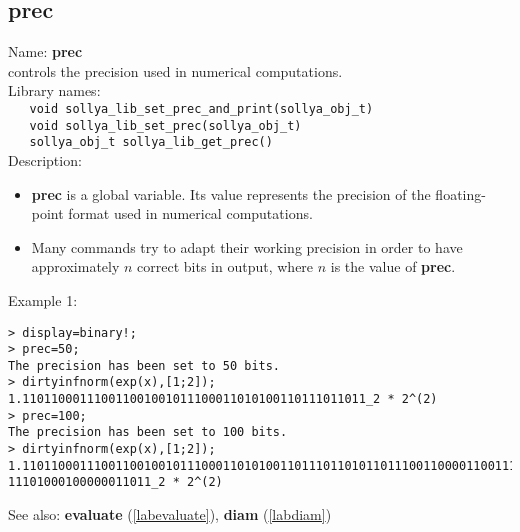 \subsection{prec}
\label{labprec}
\noindent Name: \textbf{prec}\\
\phantom{aaa}controls the precision used in numerical computations.\\[0.2cm]
\noindent Library names:\\
\verb|   void sollya_lib_set_prec_and_print(sollya_obj_t)|\\
\verb|   void sollya_lib_set_prec(sollya_obj_t)|\\
\verb|   sollya_obj_t sollya_lib_get_prec()|\\[0.2cm]
\noindent Description: \begin{itemize}

\item \textbf{prec} is a global variable. Its value represents the precision of the 
   floating-point format used in numerical computations.

\item Many commands try to adapt their working precision in order to have 
   approximately $n$ correct bits in output, where $n$ is the value of \textbf{prec}.
\end{itemize}
\noindent Example 1: 
\begin{center}\begin{minipage}{15cm}\begin{Verbatim}[frame=single]
> display=binary!;
> prec=50;
The precision has been set to 50 bits.
> dirtyinfnorm(exp(x),[1;2]);
1.110110001110011001001011100011010100110111011011_2 * 2^(2)
> prec=100;
The precision has been set to 100 bits.
> dirtyinfnorm(exp(x),[1;2]);
1.110110001110011001001011100011010100110111011010110111001100001100111010001110
11101000100000011011_2 * 2^(2)
\end{Verbatim}
\end{minipage}\end{center}
See also: \textbf{evaluate} (\ref{labevaluate}), \textbf{diam} (\ref{labdiam})
